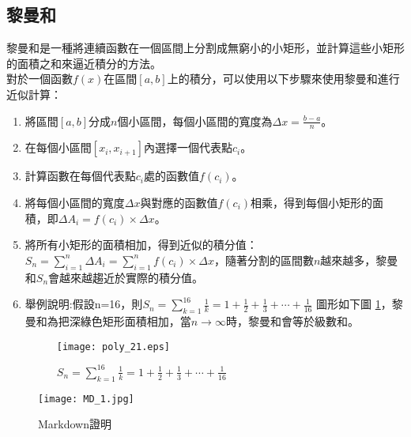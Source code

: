\documentclass[12pt, a4paper]{article}
\begin{document}
\subsection{黎曼和}
黎曼和是一種將連續函數在一個區間上分割成無窮小的小矩形，並計算這些小矩形的面積之和來逼近積分的方法。\\
對於一個函數\;$f(x)$\;在區間\;$[a,b]$\;上的積分，可以使用以下步驟來使用黎曼和進行近似計算\;：
\begin{enumerate}
\item 將區間\;$[a,b]$\;分成\;$n$\;個小區間，每個小區間的寬度為\;$\Delta x = \frac{b-a}{n}$\;。
\item 在每個小區間\;$[x_i,x_{i+1}]$\;內選擇一個代表點\;$c_i$\;。
\item 計算函數在每個代表點\;$c_i$\;處的函數值\;$f(c_i)$\;。
\item 將每個小區間的寬度\;$\Delta x$\;與對應的函數值\;$f(c_i)$\;相乘，得到每個小矩形的面積，即\;$\Delta A_i = f(c_i) \times \Delta x$\;。
\item 將所有小矩形的面積相加，得到近似的積分值\;：\\
$S_n= \sum_{i=1}^n \Delta A_i = \sum_{i=1}^n f(c_i) \times \Delta x$，隨著分割的區間數\;$n$\;越來越多，黎曼和\;$S_n$\;會越來越趨近於實際的積分值。
\item 舉例說明\;:假設\;n=16，則\;$S_n=\sum_{k=1}^{16} \frac{1}{k}=1+\frac{1}{2}+\frac{1}{3}+\cdots +\frac{1}{16}$\;
圖形如下圖 \ref{fig:poly_21.eps}\;，黎曼和為把深綠色矩形面積相加，當\;$n \rightarrow \infty$\;時，黎曼和會等於級數和。
\begin{figure}[H]
\centering
\texttt{[image: poly\_21.eps]}
\caption{$S_n=\sum_{k=1}^{16} \frac{1}{k}=1+\frac{1}{2}+\frac{1}{3}+\cdots +\frac{1}{16}$}
\label{fig:poly_21.eps}
\end{figure} 
\end{enumerate}

\begin{figure}[H]
\centering
\texttt{[image: MD\_1.jpg]}
\caption{Markdown證明}
\label{fig:MD_1.jpg}
\end{figure} 
\end{document}
